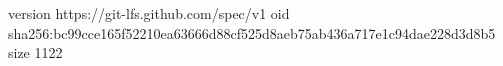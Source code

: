 version https://git-lfs.github.com/spec/v1
oid sha256:bc99cce165f52210ea63666d88cf525d8aeb75ab436a717e1c94dae228d3d8b5
size 1122

